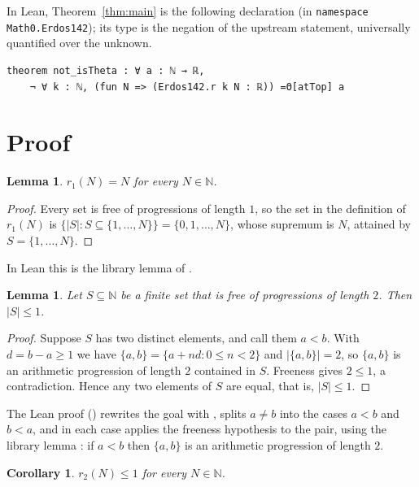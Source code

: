 \documentclass[11pt]{amsart}
\theoremstyle{plain}
\newtheorem{lemma}[theorem]{Lemma}
\newtheorem{corollary}[theorem]{Corollary}
\theoremstyle{definition}
\newcommand{\N}{\mathbb{N}}
\begin{document}
In Lean, Theorem~\ref{thm:main} is the following declaration (in \texttt{namespace Math0.Erdos142}); its type is the negation of the upstream statement, universally quantified over the unknown.
\begin{lstlisting}
theorem not_isTheta : ∀ a : ℕ → ℝ,
    ¬ ∀ k : ℕ, (fun N => (Erdos142.r k N : ℝ)) =Θ[atTop] a
\end{lstlisting}

\section{Proof}\label{sec:proof}

\begin{lemma}\label{lem:r1}
$r_1(N)=N$ for every $N\in\N$.
\end{lemma}

\begin{proof}
Every set is free of progressions of length $1$, so the set in the definition of $r_1(N)$ is $\{|S| : S\subseteq\{1,\dots,N\}\}=\{0,1,\dots,N\}$, whose supremum is $N$, attained by $S=\{1,\dots,N\}$.
\end{proof}

In Lean this is the library lemma  of \cite{FC}.

\begin{lemma}\label{lem:pair}
Let $S\subseteq\N$ be a finite set that is free of progressions of length $2$. Then $|S|\le1$.
\end{lemma}

\begin{proof}
Suppose $S$ has two distinct elements, and call them $a<b$. With $d=b-a\ge1$ we have $\{a,b\}=\{a+nd : 0\le n<2\}$ and $|\{a,b\}|=2$, so $\{a,b\}$ is an arithmetic progression of length $2$ contained in $S$. Freeness gives $2\le1$, a contradiction. Hence any two elements of $S$ are equal, that is, $|S|\le1$.
\end{proof}

The Lean proof () rewrites the goal with , splits $a\ne b$ into the cases $a<b$ and $b<a$, and in each case applies the freeness hypothesis to the pair, using the library lemma : if $a<b$ then $\{a,b\}$ is an arithmetic progression of length $2$.

\begin{corollary}\label{cor:r2}
$r_2(N)\le1$ for every $N\in\N$.
\end{corollary}
\end{document}
